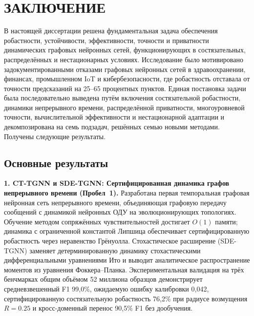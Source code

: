 
\chapter*{ЗАКЛЮЧЕНИЕ}

В настоящей диссертации решена фундаментальная задача обеспечения робастности, устойчивости, эффективности, точности и приватности динамических графовых нейронных сетей, функционирующих в состязательных, распределённых и нестационарных условиях. Исследование было мотивировано задокументированными отказами графовых нейронных сетей в здравоохранении, финансах, промышленном IoT и кибербезопасности, где робастность отставала от точности предсказаний на 25--65 процентных пунктов. Единая постановка задачи была последовательно выведена путём включения состязательной робастности, динамики непрерывного времени, распределённой приватности, многоуровневой точности, вычислительной эффективности и нестационарной адаптации и декомпозирована на семь подзадач, решённых семью новыми методами. Получены следующие результаты.


\section*{Основные результаты}

\noindent\textbf{1. CT-TGNN и SDE-TGNN: Сертифицированная динамика графов непрерывного времени (Пробел~1).}
Разработана первая темпоральная графовая нейронная сеть непрерывного времени, объединяющая графовую передачу сообщений с динамикой нейронных ОДУ на эволюционирующих топологиях. Обучение методом сопряжённых чувствительностей достигает $O(1)$ памяти; динамика с ограниченной константой Липшица обеспечивает сертифицированную робастность через неравенство Грёнуолла. Стохастическое расширение (SDE-TGNN) заменяет детерминированную динамику стохастическими дифференциальными уравнениями Ито и выводит аналитическое распространение моментов из уравнения Фоккера--Планка. Экспериментальная валидация на трёх бенчмарках общим объёмом 52 миллиона образцов демонстрирует средневзвешенный F1 99,0\%, ожидаемую ошибку калибровки 0,042, сертифицированную состязательную робастность 76,2\% при радиусе возмущения $R=0.25$ и кросс-доменный перенос 90,5\% F1 без дообучения.

